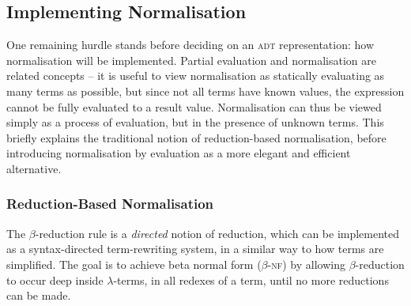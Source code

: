 \documentclass[../../../main.tex]{subfiles}
\begin{document}

\subsection{Implementing Normalisation}\label{sec:normalisation-approach}
One remaining hurdle stands before deciding on an \textsc{adt} representation: how normalisation will be implemented.
Partial evaluation and normalisation are related concepts -- it is useful to view normalisation as statically evaluating as many terms as possible, but since not all terms have known values, the expression cannot be fully evaluated to a result value.
Normalisation can thus be viewed simply as a process of evaluation, but in the presence of unknown terms.
This  briefly explains the traditional notion of reduction-based normalisation, before introducing normalisation by evaluation as a more elegant and efficient alternative.


\subsubsection{Reduction-Based Normalisation}
The $\beta$-reduction rule is a \emph{directed} notion of reduction, which can be implemented as a syntax-directed term-rewriting system, in a similar way to how  terms are simplified.
The goal is to achieve beta normal form ($\beta$-\textsc{nf}) by allowing $\beta$-reduction to occur deep inside $\lambda$-terms, in all redexes of a term, until no more reductions can be made.
\end{document}
